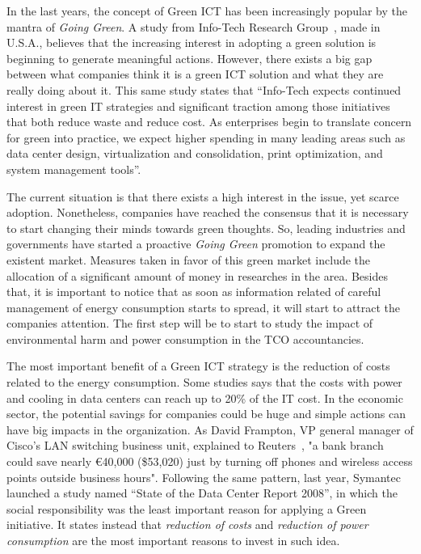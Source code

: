     In the last years, the concept of Green ICT has been increasingly popular by the mantra of \emph{Going Green}. A study from Info-Tech Research Group~\cite{info-tech07}, made in U.S.A., believes that the increasing interest in adopting a green solution is beginning to generate meaningful actions. However, there exists a big gap between what companies think it is a green ICT solution and what they are really doing about it. This same study states that ``Info-Tech expects continued interest in green IT strategies and significant traction among those initiatives that both reduce waste and reduce cost. As enterprises begin to translate concern for green into practice, we expect higher spending in many leading areas such as data center design, virtualization and consolidation, print optimization, and system management tools''.
    
    The current situation is that there exists a high interest in the issue, yet scarce adoption. Nonetheless, companies have reached the consensus that it is necessary to start changing their minds towards green thoughts. So, leading industries and governments have started a proactive \emph{Going Green} promotion to expand the existent market. Measures taken in favor of this green market include the allocation of a significant amount of money in researches in the area. Besides that, it is important to notice that as soon as information related of careful management of energy consumption starts to spread, it will start to attract the companies attention. The first step will be to start to study the impact of environmental harm and power consumption in the TCO accountancies.
    
    The most important benefit of a Green ICT strategy is the reduction of costs related to the energy consumption. Some studies says that the costs with power and cooling in data centers can reach up to 20\% of the IT cost. In the economic sector, the potential savings for companies could be huge and simple actions can have big impacts in the organization. As David Frampton, VP general manager of Cisco's LAN switching business unit, explained to Reuters~\cite{Chestney2009}, "a bank branch could save nearly \euro40,000 (\$53,020) just by turning off phones and wireless access points outside business hours". Following the same pattern, last year, Symantec launched a study named ``State of the Data Center Report 2008'', in which the social responsibility was the least important reason for applying a Green initiative. It states instead that \emph{reduction of costs} and \emph{reduction of power consumption} are the most important reasons to invest in such idea. 
    
